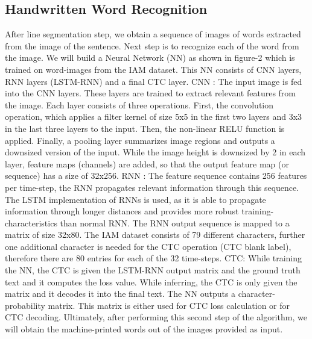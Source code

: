 \documentclass[a4paper, 10pt,twocolumn]{article}
\begin{document}
\subsection*{Handwritten Word Recognition}
After line segmentation step, we obtain a sequence of images of words extracted from the image of the sentence. Next step is to recognize each of the word from the image. We will build a Neural Network (NN) as shown in figure-2 which is trained on word-images from the IAM dataset. This NN consists of CNN layers, RNN layers (LSTM-RNN) and a final CTC layer. \newline \newline
CNN : The input image is fed into the CNN layers. These layers are trained to extract relevant features from the image. Each layer consists of three operations. First, the convolution operation, which applies a filter kernel of size 5x5 in the first two layers and 3x3 in the last three layers to the input. Then, the non-linear RELU function is applied. Finally, a pooling layer summarizes image regions and outputs a downsized version of the input. While the image height is downsized by 2 in each layer, feature maps (channels) are added, so that the output feature map (or sequence) has a size of 32x256.
\newline \newline
RNN : The feature sequence contains 256 features per time-step, the RNN propagates relevant information through this sequence. The LSTM implementation of RNNs is used, as it is able to propagate information through longer distances and provides more robust training-characteristics than normal RNN. The RNN output sequence is mapped to a matrix of size 32x80. The IAM dataset consists of 79 different characters, further one additional character is needed for the CTC operation (CTC blank label), therefore there are 80 entries for each of the 32 time-steps.
\newline \newline 
CTC: While training the NN, the CTC is given the LSTM-RNN output matrix and the ground truth text and it computes the loss value. While inferring, the CTC is only given the matrix and it decodes it into the final text.
\newline \newline
The NN outputs a character-probability matrix. This matrix is either used for CTC loss calculation or for CTC decoding. Ultimately, after performing this second step of the algorithm, we will obtain the machine-printed words out of the images provided as input.
\end{document}
